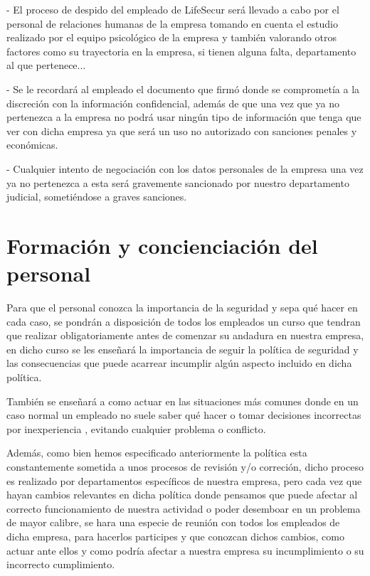 \documentclass[11pt,bibtotoc,noliststotoc,BCOR0mm]{scrbook}
\begin{document}
- El proceso de despido del empleado de LifeSecur será llevado a cabo por el personal de relaciones humanas de la empresa tomando en cuenta el estudio realizado por el equipo psicológico de la empresa y también valorando otros factores como su trayectoria en la empresa, si tienen alguna falta, departamento al que pertenece...

- Se le recordará al empleado el documento que firmó donde se comprometía a la discreción con la información confidencial, además de que una vez que ya no pertenezca a la empresa no podrá usar ningún tipo de información que tenga que ver con dicha empresa ya que será un uso no autorizado con sanciones penales y económicas.

- Cualquier intento de negociación con los datos personales de la empresa una vez ya no pertenezca a esta será gravemente sancionado por nuestro departamento judicial, sometiéndose a graves sanciones.

\section{Formación y concienciación del personal}

Para que el personal conozca la importancia de la seguridad y sepa qué hacer en cada caso, se pondrán a disposición de todos los empleados un curso que tendran que realizar obligatoriamente antes de comenzar su andadura en nuestra empresa, en dicho curso se les enseñará la importancia de seguir la política de seguridad y las consecuencias que puede acarrear incumplir algún aspecto incluido en dicha política.

También se enseñará a como actuar en las situaciones más comunes donde en un caso normal un empleado no suele saber qué hacer o tomar decisiones incorrectas por inexperiencia , evitando cualquier problema o conflicto.

Además, como bien hemos especificado anteriormente la política esta constantemente sometida a unos procesos de revisión y/o correción, dicho proceso es realizado por departamentos específicos de nuestra empresa, pero cada vez que hayan cambios relevantes en dicha política donde pensamos que puede afectar al correcto funcionamiento de nuestra actividad o poder desemboar en un problema de mayor calibre, se hara una especie de reunión con todos los empleados de dicha empresa, para hacerlos participes y que conozcan dichos cambios, como actuar ante ellos y como podría afectar a nuestra empresa su incumplimiento o su incorrecto cumplimiento.
\end{document}
